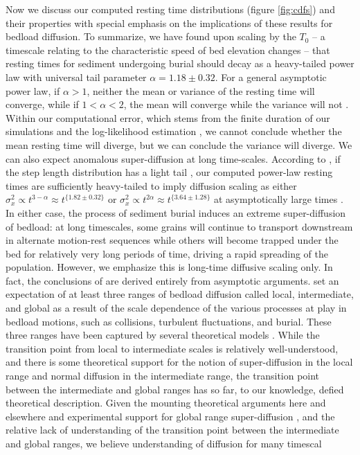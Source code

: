 \documentclass[draft]{agujournal2018}
\begin{document}
Now we discuss our computed resting time distributions (figure \ref{fig:cdfs}) and their properties with special emphasis on the implications of these results for bedload diffusion.
To summarize, we have found upon scaling by the $T_0$ -- a timescale relating to the characteristic speed of bed elevation changes -- that resting times for sediment undergoing burial should decay as a heavy-tailed power law with universal tail parameter $\alpha = 1.18 \pm 0.32$.
For a general asymptotic power law, if $\alpha>1$, neither the mean or variance of the resting time will converge, while if $1<\alpha <2$, the mean will converge while the variance will not \citep[e.g.][]{Bradley2017}.
Within our computational error, which stems from the finite duration of our simulations and the log-likelihood estimation \citep[e.g.][]{Newman2005}, we cannot conclude whether the mean resting time will diverge, but we can conclude the variance will diverge.
We can also expect anomalous super-diffusion at long time-scales.
According to \citet{Weeks1998}, if the step length distribution has a light tail \citep[e.g.][]{Hassan2013}, our computed power-law resting times are sufficiently heavy-tailed to imply diffusion scaling as either $\sigma_x^2 \propto t^{3-\alpha} \approx t^{\{1.82 \pm 0.32 \}}$ or $\sigma_x^2 \propto t^{2\alpha} \approx t^{\{3.64\pm 1.28\}}$ at asymptotically large times \citep[e.g.][]{Bradley2017}.
In either case, the process of sediment burial induces an extreme super-diffusion of bedload: at long timescales, some grains will continue to transport downstream in alternate motion-rest sequences while others will become trapped under the bed for relatively very long periods of time, driving a rapid spreading of the population.
However, we emphasize this is long-time diffusive scaling only.
In fact, the conclusions of \citet{Weeks1998} are derived entirely from asymptotic arguments.
\citet{Nikora2001,Nikora2002} set an expectation of at least three ranges of bedload diffusion called local, intermediate, and global as a result of the scale dependence of the various processes at play in bedload motions, such as collisions, turbulent fluctuations, and burial.
These three ranges have been captured by several theoretical models \citep[e.g.]{Bialik2012,Zhang2012,Fan2016}.
While the transition point from local to intermediate scales is relatively well-understood, and there is some theoretical support for the notion of super-diffusion in the local range and normal diffusion in the intermediate range, the transition point between the intermediate and global ranges has so far, to our knowledge, defied theoretical description.
Given the mounting theoretical arguments here and elsewhere \citep[e.g.][]{Martin2014,} and experimental support for global range super-diffusion \citep[e.g.][]{Phillips2013,Bradley2017,Pretzlav2016,Olinde2015,Voepel2013}, and the relative lack of understanding of the transition point between the intermediate and global ranges, we believe understanding of diffusion for many timescal
\end{document}
